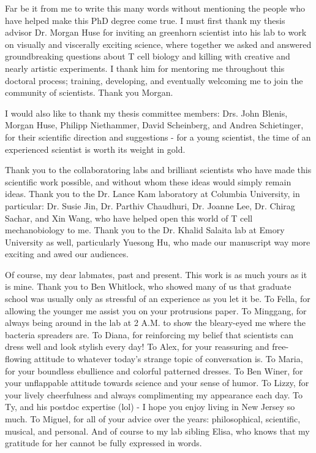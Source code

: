 \documentclass[phd,tocprelim]{cornell}
\begin{document}
\begin{acknowledgements}
Far be it from me to write this many words without mentioning the people who have helped make this PhD degree come true. I must first thank my thesis advisor Dr. Morgan Huse for inviting an greenhorn scientist into his lab to work on visually and viscerally exciting science, where together we asked and answered groundbreaking questions about T cell biology and killing with creative and nearly artistic experiments. I thank him for mentoring me throughout this doctoral process; training, developing, and eventually welcoming me to join the community of scientists. Thank you Morgan.

I would also like to thank my thesis committee members: Drs. John Blenis,  Morgan Huse, Philipp Niethammer, David Scheinberg, and Andrea Schietinger, for their scientific direction and suggestions - for a young scientist, the time of an experienced scientist is worth its weight in gold. 

Thank you to the collaboratoring labs and brilliant scientists who have made this scientific work possible, and without whom these ideas would simply remain ideas. Thank you to the Dr. Lance Kam laboratory at Columbia University, in particular: Dr. Susie Jin, Dr. Parthiv Chaudhuri,  Dr. Joanne Lee, Dr. Chirag Sachar, and Xin Wang, who have helped open this world of T cell mechanobiology to me. Thank you to the Dr. Khalid Salaita lab at Emory University as well, particularly Yuesong Hu, who made our manuscript way more exciting and awed our audiences.

Of course, my dear labmates, past and present. This work is as much yours as it is mine. Thank you to Ben Whitlock, who showed many of us that graduate school was usually only as stressful of an experience as you let it be. To Fella, for allowing the younger me assist you on your protrusions paper. To Minggang, for always being around in the lab at 2 A.M. to show the bleary-eyed me where the bacteria spreaders are. To Diana, for reinforcing my belief that scientists can dress well and look stylish every day! To Alex, for your reassuring and free-flowing attitude to whatever today's strange topic of conversation is. To Maria, for your boundless ebullience and colorful patterned dresses. To Ben Winer, for your unflappable attitude towards science and your sense of humor. To Lizzy, for your lively cheerfulness and always complimenting my appearance each day. To Ty, and his postdoc expertise (lol) - I hope you enjoy living in New Jersey so much. To Miguel, for all of your advice over the years: philosophical, scientific, musical, and personal. And of course to my lab sibling Elisa, who knows that my gratitude for her cannot be fully expressed in words. 


\end{acknowledgements}
\end{document}
